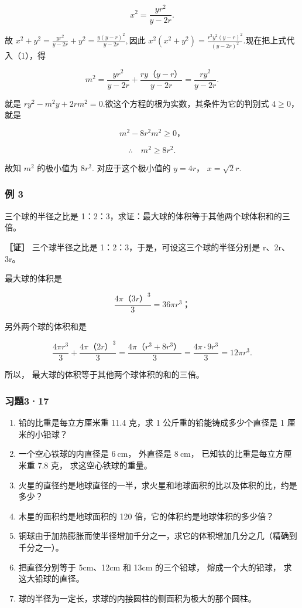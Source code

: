\[
x ^ {2} = \frac {y r ^ {2}}{y - 2 r}. \tag {2}
\]

故
\(x^{2} + y^{2} = \frac{yr^{2}}{y - 2r} +y^{2} = \frac{y(y - r)^{2}}{y - 2r},\)因此
\(x^{2}(x^{2} + y^{2}) = \frac{r^{2}y^{2}(y - r)^{2}}{(y - 2r)^{2}}.\)现在把上式代入（1），得

\[
m ^ {2} = \frac {y r ^ {2}}{y - 2 r} + \frac {r y \text{（}y - r\text{）}}{y - 2 r} = \frac {r y ^ {2}}{y - 2 r}.
\]

就是
\(ry^{2} - m^{2}y + 2rm^{2} = 0.\)欲这个方程的根为实数，其条件为它的判别式
\(4 \geqslant 0\)，就是

\[
m ^ {2} - 8 r ^ {2} m ^ {2} \geqslant 0\text{，}
\]

\[
\therefore \quad m ^ {2} \geqslant 8 r ^ {2}.
\]

故知 \(m^2\) 的极小值为 \(8r^2\). 对应于这个极小值的 \(y = 4r\)，
\(x = \sqrt{2} r\).

\subsubsection{例 3}

三个球的半径之比是
1：2：3，求证：最大球的体积等于其他两个球体积和的三倍。

\textbf{［证］} 三个球半径之比是 1：2：3，于是，可设这三个球的半径分别是
r、2r、3r。

最大球的体积是

\[
\frac {4 \pi \text{（}3 r\text{）} ^ {3}}{3} = 36 \pi r ^ {3}\text{；}
\]

另外两个球的体积和是

\[
\frac {4 \pi r ^ {3}}{3} + \frac {4 \pi \text{（}2 r\text{）} ^ {3}}{3} = \frac {4 \pi \text{（}r ^ {3} + 8 r ^ {3}\text{）}}{3} = \frac {4 \pi \cdot 9 r ^ {3}}{3} = 12 \pi r ^ {3}.
\]

所以， 最大球的体积等于其他两个球体积的和的三倍。

\subsubsection{习题3·17}

\begin{enumerate}
\item
  铅的比重是每立方厘米重 11.4 克，求 1 公斤重的铅能铸成多少个直径是 1
  厘米的小铅球？
\item
  一个空心铁球的内直径是 \(6 \mathrm{~cm}\)， 外直径是
  \(8 \mathrm{~cm}\)， 已知铁的比重是每立方厘米重 7.8 克，
  求这空心铁球的重量。
\item
  火星的直径约是地球直径的一半，求火星和地球面积的比以及体积的比，约是多少？
\item
  木星的面积约是地球面积的 120 倍，它的体积约是地球体积的多少倍？
\item
  铜球由于加热膨胀而使半径增加千分之一，求它的体积增加几分之几（精确到千分之一）。
\item
  把直径分别等于 5cm、12cm 和 13cm 的三个铅球， 熔成一个大的铅球，
  求这大铅球的直径。
\item
  球的半径为一定长，求球的内接圆柱的侧面积为极大的那个圆柱。
\end{enumerate}


